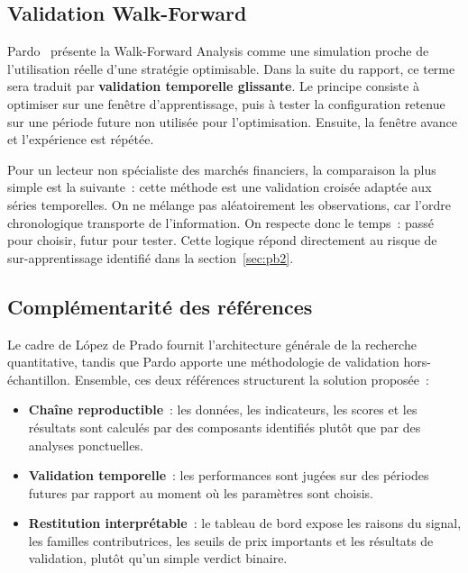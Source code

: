 \subsection{Validation Walk-Forward}

Pardo~\cite{pardo2008} présente la Walk-Forward Analysis comme une simulation proche
de l'utilisation réelle d'une stratégie optimisable. Dans la suite du rapport, ce terme
sera traduit par \textbf{validation temporelle glissante}. Le principe consiste à
optimiser sur une fenêtre d'apprentissage, puis à tester la configuration retenue sur
une période future non utilisée pour l'optimisation. Ensuite, la fenêtre avance et
l'expérience est répétée.

Pour un lecteur non spécialiste des marchés financiers, la comparaison la plus simple est la
suivante~: cette méthode est une validation croisée adaptée aux séries temporelles.
On ne mélange pas aléatoirement les observations, car l'ordre chronologique transporte
de l'information. On respecte donc le temps~: passé pour choisir, futur pour tester.
Cette logique répond directement au risque de sur-apprentissage identifié dans la
section~\ref{sec:pb2}.

\subsection{Complémentarité des références}

Le cadre de López de Prado fournit l'architecture générale de la recherche quantitative,
tandis que Pardo apporte une méthodologie de validation hors-échantillon. Ensemble,
ces deux références structurent la solution proposée~:

\begin{itemize}
    \item \textbf{Chaîne reproductible}~: les données, les indicateurs, les scores et
    les résultats sont calculés par des composants identifiés plutôt que par des analyses
    ponctuelles.
    \item \textbf{Validation temporelle}~: les performances sont jugées sur des périodes
    futures par rapport au moment où les paramètres sont choisis.
    \item \textbf{Restitution interprétable}~: le tableau de bord expose les raisons du
    signal, les familles contributrices, les seuils de prix importants et les résultats
    de validation, plutôt qu'un simple verdict binaire.
\end{itemize}

